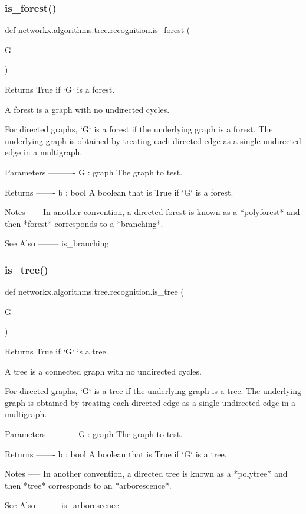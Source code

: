 \subsubsection{\texorpdfstring{is\+\_\+forest()}{is\_forest()}}
{\footnotesize\ttfamily def networkx.\+algorithms.\+tree.\+recognition.\+is\+\_\+forest (\begin{DoxyParamCaption}\item[{}]{G }\end{DoxyParamCaption})}

\begin{DoxyVerb}Returns True if `G` is a forest.

A forest is a graph with no undirected cycles.

For directed graphs, `G` is a forest if the underlying graph is a forest.
The underlying graph is obtained by treating each directed edge as a single
undirected edge in a multigraph.

Parameters
----------
G : graph
    The graph to test.

Returns
-------
b : bool
    A boolean that is True if `G` is a forest.

Notes
-----
In another convention, a directed forest is known as a *polyforest* and
then *forest* corresponds to a *branching*.

See Also
--------
is_branching\end{DoxyVerb}
 \mbox{\label{namespacenetworkx_1_1algorithms_1_1tree_1_1recognition_a5a576f572714440375b8ff046d00d024}} 
\subsubsection{\texorpdfstring{is\+\_\+tree()}{is\_tree()}}
{\footnotesize\ttfamily def networkx.\+algorithms.\+tree.\+recognition.\+is\+\_\+tree (\begin{DoxyParamCaption}\item[{}]{G }\end{DoxyParamCaption})}

\begin{DoxyVerb}Returns True if `G` is a tree.

A tree is a connected graph with no undirected cycles.

For directed graphs, `G` is a tree if the underlying graph is a tree. The
underlying graph is obtained by treating each directed edge as a single
undirected edge in a multigraph.

Parameters
----------
G : graph
    The graph to test.

Returns
-------
b : bool
    A boolean that is True if `G` is a tree.

Notes
-----
In another convention, a directed tree is known as a *polytree* and then
*tree* corresponds to an *arborescence*.

See Also
--------
is_arborescence\end{DoxyVerb}
 
